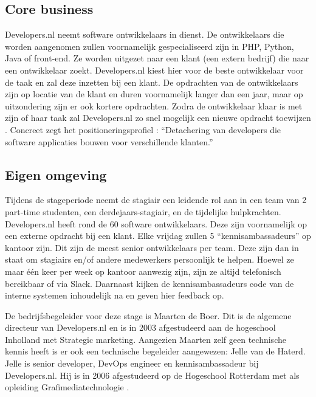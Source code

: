 \subsection{Core business}
Developers.nl neemt software ontwikkelaars in dienst. De ontwikkelaars die worden aangenomen zullen voornamelijk gespecialiseerd zijn in PHP, Python, Java of front-end. Ze worden uitgezet naar een klant (een extern bedrijf) die naar een ontwikkelaar zoekt. Developers.nl kiest hier voor de beste ontwikkelaar voor de taak en zal deze inzetten bij een klant. De opdrachten van de ontwikkelaars zijn op locatie van de klant en duren voornamelijk langer dan een jaar, maar op uitzondering zijn er ook kortere opdrachten. Zodra de ontwikkelaar klaar is met zijn of haar taak zal Developers.nl zo snel mogelijk een nieuwe opdracht toewijzen \parencite{Stageplan}. Concreet zegt het positioneringsprofiel \parencite{Positioneringsprofiel}: \enquote{Detachering van developers die software applicaties bouwen voor verschillende klanten.}

\subsection{Eigen omgeving}

Tijdens de stageperiode neemt de stagiair een leidende rol aan in een team van 2 part-time studenten, een derdejaars-stagiair, en de tijdelijke hulpkrachten. Developers.nl heeft rond de 60 software ontwikkelaars. Deze zijn voornamelijk op een externe opdracht bij een klant. Elke vrijdag zullen 5 \enquote{kennisambassadeurs} op kantoor zijn. Dit zijn de meest senior ontwikkelaars per team. Deze zijn dan in staat om stagiairs en/of andere medewerkers persoonlijk te helpen. Hoewel ze maar één keer per week op kantoor aanwezig zijn, zijn ze altijd telefonisch bereikbaar of via Slack. Daarnaast kijken de kennisambassadeurs code van de interne systemen inhoudelijk na en geven hier feedback op.

De bedrijfsbegeleider voor deze stage is Maarten de Boer. Dit is de algemene directeur van Developers.nl en is in 2003 afgestudeerd aan de hogeschool Inholland met Strategic marketing. Aangezien Maarten zelf geen technische kennis heeft is er ook een technische begeleider aangewezen: Jelle van de Haterd. Jelle is senior developer, DevOps engineer en kennisambassadeur bij Developers.nl. Hij is in 2006 afgestudeerd op de Hogeschool Rotterdam met als opleiding Grafimediatechnologie \parencite{Afstudeervoorstel}.
